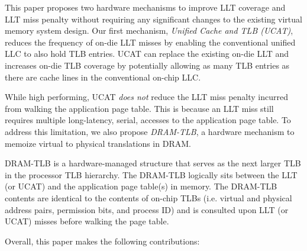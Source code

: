 This paper proposes two hardware mechanisms to improve LLT coverage and LLT miss penalty without requiring any significant changes to the existing virtual memory system design. Our first mechanism, {\em Unified Cache and TLB (UCAT)}, reduces the frequency of on-die LLT misses by enabling the conventional unified LLC to also hold TLB entries. UCAT can replace the existing on-die LLT and increases on-die TLB coverage by potentially allowing as many TLB entries as there are cache lines in the conventional on-chip LLC.


While high performing, UCAT {\em does not} reduce the LLT miss penalty incurred from walking the application page table. This is because an LLT miss still requires multiple long-latency, serial, accesses to the application page table. To address this limitation, we also propose {\em DRAM-TLB}, a hardware mechanism to memoize virtual to physical translations in DRAM.

DRAM-TLB is a hardware-managed structure that serves as the next
larger TLB in the processor TLB hierarchy. The DRAM-TLB logically sits
between the LLT (or UCAT) and the application page table(s) in memory. The
DRAM-TLB contents are identical to the contents of on-chip TLBs (i.e.
virtual and physical address pairs, permission bits, and process ID)
and is consulted upon LLT (or UCAT) misses before walking the page table.


Overall, this paper makes the following contributions:

